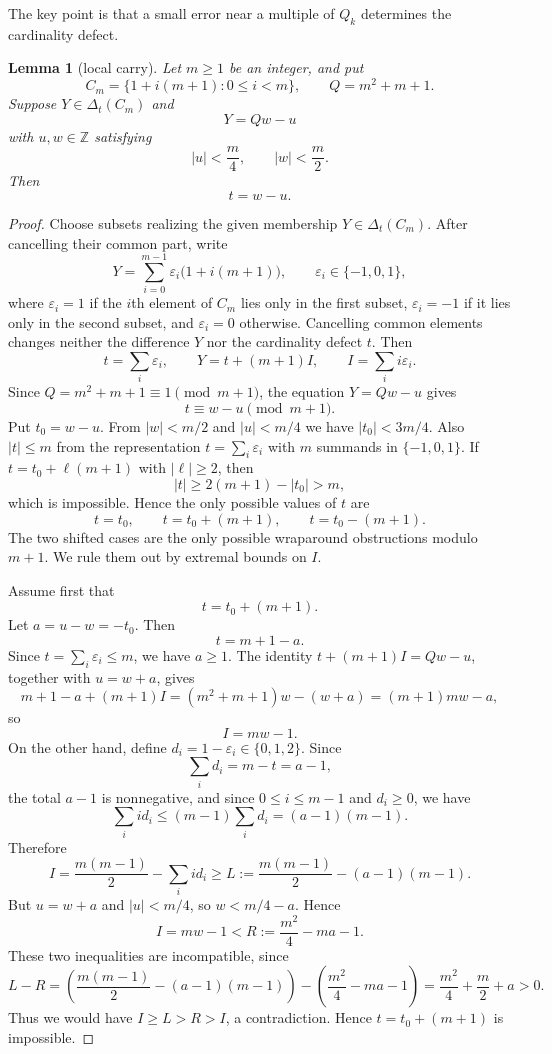 \documentclass[11pt]{article}
\newtheorem{lemma}{Lemma}
\newcommand{\Z}{\mathbb{Z}}
\newcommand{\eps}{\varepsilon}
\newcommand{\D}{\Delta}
\begin{document}
The key point is that a small error near a multiple of $Q_k$ determines the cardinality defect.

\begin{lemma}[local carry]\label{lem:local-carry}
Let $m\ge1$ be an integer, and put
\[
        C_m=\{1+i(m+1):0\le i<m\},
        \qquad
        Q=m^2+m+1.
\]
Suppose $Y\in \D_t(C_m)$ and
\[
        Y=Qw-u
\]
with $u,w\in\Z$ satisfying
\[
        |u|<\frac m4,
        \qquad
        |w|<\frac m2.
\]
Then
\[
        t=w-u.
\]
\end{lemma}

\begin{proof}
Choose subsets realizing the given membership $Y\in\D_t(C_m)$.  After cancelling their common part, write
\[
        Y=\sum_{i=0}^{m-1}\eps_i\bigl(1+i(m+1)\bigr),
        \qquad
        \eps_i\in\{-1,0,1\},
\]
where $\eps_i=1$ if the $i$th element of $C_m$ lies only in the first subset, $\eps_i=-1$ if it lies only in the second subset, and $\eps_i=0$ otherwise.  Cancelling common elements changes neither the difference $Y$ nor the cardinality defect $t$.  Then
\[
        t=\sum_i\eps_i,
        \qquad
        Y=t+(m+1)I,
        \qquad
        I=\sum_i i\eps_i.
\]
Since $Q=m^2+m+1\equiv1\pmod {m+1}$, the equation $Y=Qw-u$ gives
\[
        t\equiv w-u\pmod {m+1}.
\]
Put $t_0=w-u$.  From $|w|<m/2$ and $|u|<m/4$ we have $|t_0|<3m/4$.  Also $|t|\le m$ from the representation $t=\sum_i\eps_i$ with $m$ summands in $\{-1,0,1\}$.  If $t=t_0+\ell(m+1)$ with $|\ell|\ge2$, then
\[
        |t|\ge 2(m+1)-|t_0|>m,
\]
which is impossible.  Hence the only possible values of $t$ are
\[
        t=t_0,
        \qquad
        t=t_0+(m+1),
        \qquad
        t=t_0-(m+1).
\]
The two shifted cases are the only possible wraparound obstructions modulo $m+1$.  We rule them out by extremal bounds on $I$.

Assume first that
\[
        t=t_0+(m+1).
\]
Let $a=u-w=-t_0$.  Then
\[
        t=m+1-a.
\]
Since $t=\sum_i\eps_i\le m$, we have $a\ge1$.  The identity $t+(m+1)I=Qw-u$, together with $u=w+a$, gives
\[
        m+1-a+(m+1)I=(m^2+m+1)w-(w+a)=(m+1)mw-a,
\]
so
\[
        I=mw-1.
\]
On the other hand, define $d_i=1-\eps_i\in\{0,1,2\}$.  Since
\[
        \sum_i d_i=m-t=a-1,
\]
the total $a-1$ is nonnegative, and since $0\le i\le m-1$ and $d_i\ge0$, we have
\[
        \sum_i i d_i\le (m-1)\sum_i d_i=(a-1)(m-1).
\]
Therefore
\[
        I
        =\frac{m(m-1)}2-\sum_i i d_i
        \ge
        L:=\frac{m(m-1)}2-(a-1)(m-1).
\]
But $u=w+a$ and $|u|<m/4$, so $w<m/4-a$.  Hence
\[
        I=mw-1<R:=\frac{m^2}{4}-ma-1.
\]
These two inequalities are incompatible, since
\[
        L-R
        =
        \left(
        \frac{m(m-1)}2-(a-1)(m-1)
        \right)
        -
        \left(
        \frac{m^2}{4}-ma-1
        \right)
        =
        \frac{m^2}{4}+\frac m2+a>0.
\]
Thus we would have $I\ge L>R>I$, a contradiction.  Hence $t=t_0+(m+1)$ is impossible.


\end{proof}
\end{document}
